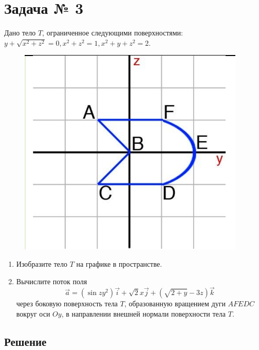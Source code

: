 \section{Задача № 3}

Дано тело \(T\), ограниченное следующими поверхностями:
\( y + \sqrt{x^2 + z^2} = 0, x^2 + z^2 = 1, x^2 + y + z^2 = 2\).

\begin{figure}[!htbp]
  \centering
  \includegraphics[scale=0.5]{images/Input_task3.png}
\end{figure}

\begin{enumerate}
  \item Изобразите тело \(T\) на графике в пространстве.
  \item Вычислите поток поля
    \[
      \vec{a} = (\sin{zy^2})\vec{i}
      + \sqrt{2} x \vec{j}
      + (\sqrt{2+y}-3z)\Vec{k}
    \]
    через боковую поверхность тела \(T\), образованную вращением дуги \(AFEDC\)
    вокруг оси \(Oy\), в направлении внешней нормали поверхности тела \(T\).
\end{enumerate}

\subsection{Решение}

